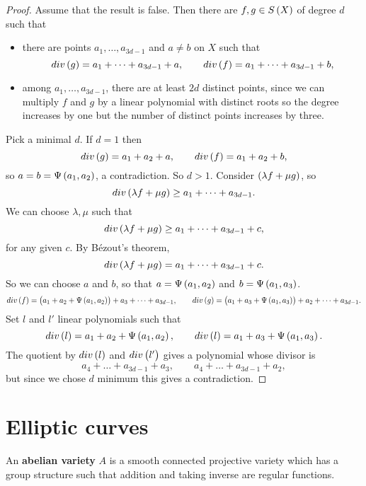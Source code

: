\begin{proof}
Assume that the result is false. Then there are $ f, g \in S\br{X} $ of degree $ d $ such that
\begin{itemize}
\item there are points $ a_1, \dots, a_{3d - 1} $ and $ a \ne b $ on $ X $ such that
$$ div\br{g} = a_1 + \dots + a_{3d - 1} + a, \qquad div\br{f} = a_1 + \dots + a_{3d - 1} + b, $$
\item among $ a_1, \dots, a_{3d - 1} $, there are at least $ 2d $ distinct points, since we can multiply $ f $ and $ g $ by a linear polynomial with distinct roots so the degree increases by one but the number of distinct points increases by three.
\end{itemize}
Pick a minimal $ d $. If $ d = 1 $ then
$$ div\br{g} = a_1 + a_2 + a, \qquad div\br{f} = a_1 + a_2 + b, $$
so $ a = b = \Psi\br{a_1, a_2} $, a contradiction. So $ d > 1 $. Consider $ \br{\lambda f + \mu g} $, so
$$ div\br{\lambda f + \mu g} \ge a_1 + \dots + a_{3d - 1}. $$
We can choose $ \lambda, \mu $ such that
$$ div\br{\lambda f + \mu g} \ge a_1 + \dots + a_{3d - 1} + c, $$
for any given $ c $. By B\'ezout's theorem,
$$ div\br{\lambda f + \mu g} = a_1 + \dots + a_{3d - 1} + c. $$
So we can choose $ a $ and $ b $, so that $ a = \Psi\br{a_1, a_2} $ and $ b = \Psi\br{a_1, a_3} $.
$$ div\br{f} = \br{a_1 + a_2 + \Psi\br{a_1, a_2}} + a_3 + \dots + a_{3d - 1}, \qquad div\br{g} = \br{a_1 + a_3 + \Psi\br{a_1, a_3}} + a_2 + \dots + a_{3d - 1}. $$
Set $ l $ and $ l' $ linear polynomials such that
$$ div\br{l} = a_1 + a_2 + \Psi\br{a_1, a_2}, \qquad div\br{l} = a_1 + a_3 + \Psi\br{a_1, a_3}. $$
The quotient by $ div\br{l} $ and $ div\br{l'} $ gives a polynomial whose divisor is
$$ a_4 + \dots + a_{3d - 1} + a_3, \qquad a_4 + \dots + a_{3d - 1} + a_2, $$
but since we chose $ d $ minimum this gives a contradiction.
\end{proof}

\pagebreak

\section{Elliptic curves}


\begin{definition}
An \textbf{abelian variety} $ A $ is a smooth connected projective variety which has a group structure such that addition and taking inverse are regular functions.
\end{definition}

